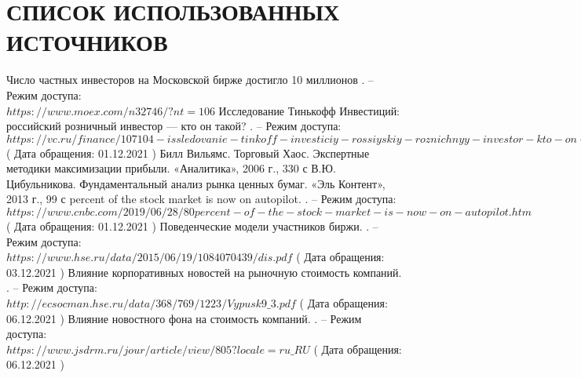 \section*{СПИСОК ИСПОЛЬЗОВАННЫХ ИСТОЧНИКОВ}

\begingroup
\renewcommand{\section}[2]{}
\begin{thebibliography}{}
    \newblock Число частных инвесторов на Московской бирже достигло 10 миллионов
    . – Режим доступа: \\
    \newblock $https://www.moex.com/n32746/?nt=106$
    \newblock Исследование Тинькофф Инвестиций: российский розничный инвестор — кто он такой?
    . – Режим доступа: \\
    \newblock $https://vc.ru/finance/107104-issledovanie-tinkoff-investiciy-rossiyskiy-roznichnyy-investor-kto-on-takoy$ ( Дата обращения: 01.12.2021 )
    \newblock Билл Вильямс. Торговый Хаос. Экспертные методики максимизации прибыли. 
«Аналитика», 2006 г., 330 с
    \newblock В.Ю. Цибульникова. Фундаментальный анализ рынка ценных бумаг. «Эль Контент»,
2013 г., 99 с
     percent of the stock market is now on autopilot.
    . – Режим доступа: \\
    \newblock $https://www.cnbc.com/2019/06/28/80percent-of-the-stock-market-is-now-on-autopilot.htm$ ( Дата обращения: 01.12.2021 )
    \newblock Поведенческие модели участников биржи.
    . – Режим доступа: \\
    \newblock $https://www.hse.ru/data/2015/06/19/1084070439/dis.pdf$ ( Дата обращения: 03.12.2021 )
    \newblock Влияние корпоративных новостей на рыночную стоимость компаний.
    . – Режим доступа: \\
    \newblock $http://ecsocman.hse.ru/data/368/769/1223/Vypusk9\_3.pdf$ ( Дата обращения: 06.12.2021 )
    \newblock Влияние новостного фона на стоимость компаний.
    . – Режим доступа: \\
    \newblock $https://www.jsdrm.ru/jour/article/view/805?locale=ru\_RU$ ( Дата обращения: 06.12.2021 )

\end{thebibliography}
